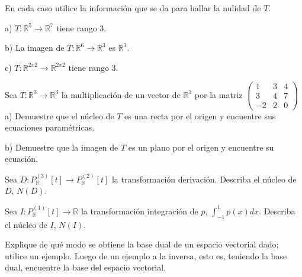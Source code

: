 \bigskip

\begin{exercise}
\item En cada caso utilice la información que se da para hallar
la nulidad de $T$.



a) $T:\mathbb{R}^5 \rightarrow \mathbb{R}^7$ tiene rango $3$.

b) La imagen de $T:\mathbb{R}^6 \rightarrow \mathbb{R}^3$ es
$\mathbb{R}^3$.

c) $T:\mathbb{R}^{2x2} \rightarrow  \mathbb{R}^{2x2}$  tiene rango
$3$.
\end{exercise}
\begin{exercise}
 \item
Sea $T:\mathbb{R}^3 \rightarrow \mathbb{R}^3$ la
multiplicación de un vector de $\mathbb{R}^3$ por la matriz $\left(\begin{array}{ccc}1 & 3 & 4  \\3  & 4 & 7
\\ -2  & 2 & 0
\end{array}
 \right)$\\

a) Demuestre que el núcleo de $T$ es una recta por el origen y
encuentre sus ecuaciones paramétricas.

b) Demuestre que la imagen de $T$ es un plano por el origen y
encuentre su ecuación.
\end{exercise}

\begin{exercise}
\item 
Sea $D: P_{\mathbb{R}}^{(3)}[t] \rightarrow  P_{\mathbb{R}}^{(2)}[t]$ la transformación derivación.
Describa el núcleo de $D$, $N(D)$.
\end{exercise}
\begin{exercise}
\item  
Sea $I: P_{\mathbb{R}}^{(1)}[t]\rightarrow \mathbb{R}$ la transformación
integración de $p$, $\int_{-1}^1 p(x)dx$. Describa el núcleo de $I$,
$N(I)$.
\end{exercise}



\begin{exercise}
\item

Explique de qué modo se obtiene la base dual de un espacio vectorial dado; utilice un ejemplo. Luego 
de un ejemplo a la inversa, esto es, teniendo la base dual, encuentre la base del espacio vectorial.
\end{exercise}

